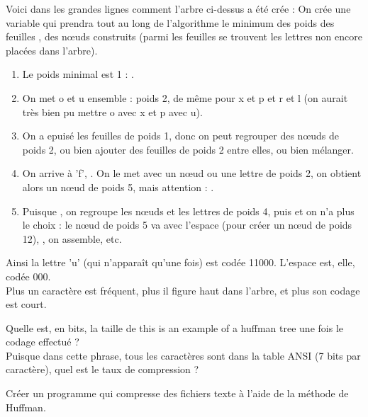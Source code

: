 \documentclass[a4paper,12pt,french]{book}
\begin{document}
	 Voici dans les grandes lignes comment l'arbre ci-dessus a été crée :
	 On crée une variable  qui prendra tout au long de l'algorithme le minimum des poids des feuilles , des n\oe uds construits (parmi les 
	 feuilles se trouvent les lettres non encore placées dans l'arbre).
	\begin{enumerate}[--]
	\item 	Le poids minimal est 1 : .
	\item 	On met o et u ensemble : poids 2, de même pour x et p et r et l 
			(on aurait très bien pu mettre o avec x et p avec u).
	\item 	On a epuisé les  feuilles de poids 1,  donc on peut regrouper des n\oe uds de poids 2, ou bien ajouter des feuilles de poids 
	2 entre elles, ou bien mélanger.\\
			
	\item 	On arrive à 'f', . On le met avec un n\oe ud ou une lettre de poids 2, on obtient alors un n\oe ud de poids 5, mais attention : 
	.
	\item 	Puisque , on regroupe les n\oe uds et les lettres de poids 4, puis  et on n'a plus le choix : le n\oe ud de poids 
	5 va avec l'espace (pour créer un n\oe ud de poids 12), , on assemble,  etc.
\end{enumerate}		 
	 
	 Ainsi la lettre 'u' (qui n'apparaît qu'une fois) est codée 11000. L'espace est, elle, codée 000.\\
	 Plus un caractère est fréquent, plus il figure haut dans l'arbre, et plus son codage est court.\\
	 
\begin{exercice}
 Quelle est, en bits, la taille de \og this is an example of a huffman tree\fg{} une fois le codage effectué ?\\

	 Puisque dans cette phrase, tous les caractères sont dans la table ANSI (7 bits par caractère), quel est le taux de compression ? \\ %
\end{exercice}
 
 
 \begin{exercice}
 Créer un programme qui compresse des fichiers texte à l'aide de la méthode de Huffman.
 \end{exercice}
\end{document}
